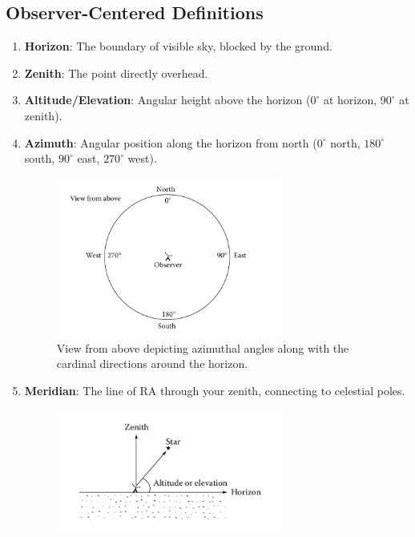 \subsection{Observer-Centered Definitions}
\begin{enumerate}
    \item \textbf{Horizon}: The boundary of visible sky, blocked by the ground.
    \item \textbf{Zenith}: The point directly overhead.
    \item \textbf{Altitude/Elevation}: Angular height above the horizon ($0^\circ$ at horizon, $90^\circ$ at zenith).
    \item \textbf{Azimuth}: Angular position along the horizon from north ($0^\circ$ north, $180^\circ$ south, $90^\circ$ east, $270^\circ$ west).
    \begin{figure}[H]
        \centering
        \includegraphics[width=0.7\textwidth]{Images/azimuthal_angles.png}
        \caption{View from above depicting azimuthal angles along with the cardinal directions around the horizon.}
        \label{fig:azimuthal_angles}
    \end{figure}
    \item \textbf{Meridian}: The line of RA through your zenith, connecting to celestial poles.
    \begin{figure}[H]
        \centering
        \includegraphics[width=0.7\textwidth]{Images/zenith_horizon_altitude_elevation.png}

\end{figure}
\end{enumerate}
